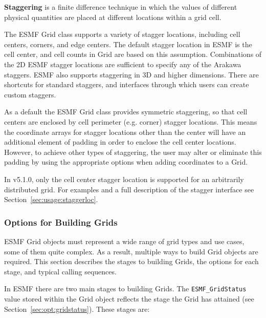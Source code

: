 {\bf Staggering} is a finite difference technique in which the values 
of different physical quantities are placed at different locations
within a grid cell. 

The ESMF Grid class supports a variety of stagger locations, including
cell centers, corners, and edge centers. The default stagger location in 
ESMF is the cell center, and cell counts in Grid are based on this assumption.
Combinations of the 2D ESMF stagger locations are sufficient to specify any of the
Arakawa staggers.  ESMF also supports staggering in 3D and higher dimensions.
There are shortcuts for standard staggers, and interfaces through which users 
can create custom staggers.  

As a default the ESMF Grid class provides symmetric staggering, so
that cell centers are enclosed by cell perimeter (e.g. corner) 
stagger locations. This means the coordinate arrays for stagger
locations other than the center will have an additional element of 
padding in order to enclose the cell center locations.
However, to achieve other types of staggering, the user may alter 
or eliminate this padding by using the appropriate options when adding
coordinates to a Grid. 
 
In v5.1.0, only the cell center stagger location is supported for an
arbitrarily distributed grid. For examples and a full description of the stagger interface 
see Section~\ref{sec:usage:staggerloc}. 

\subsubsection{Options for Building Grids}
\label{sec:gridcreateoptions}

ESMF Grid objects must represent a wide range of grid types 
and use cases, some of them quite complex.  As a result, multiple
ways to build Grid objects are required.  This section describes
the stages to building Grids, the options for each stage, and 
typical calling sequences.

In ESMF there are two main stages to building Grids.  The
{\tt ESMF\_GridStatus} value stored within the Grid object reflects
the stage the Grid has attained (see Section~\ref{sec:opt:gridstatus}).
These stages are:

